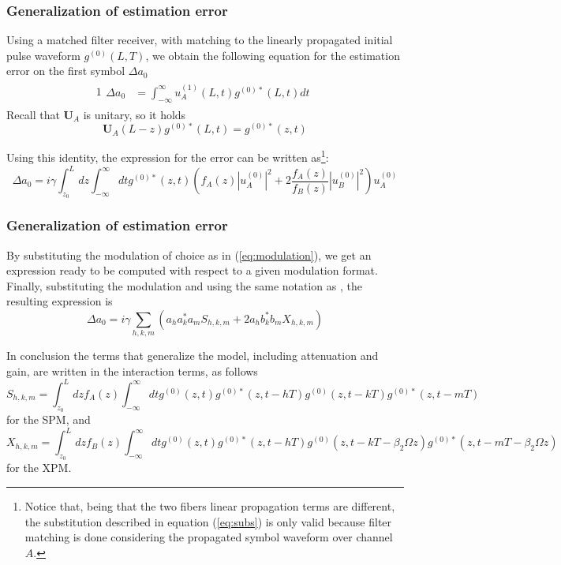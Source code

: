 \documentclass[8pt]{beamer} %
\begin{document}
\begin{frame}
    \frametitle{Generalization of estimation error}
    Using a matched filter receiver, with matching to the linearly propagated initial pulse waveform $g^{(0)}(L, T)$, we obtain the following equation for the estimation error on the first symbol $\Delta a_0$
    \begin{alignat}{1}
        \begin{aligned}
            \Delta a_0 & = \int_{-\infty}^{\infty} u_A^{(1)}(L, t) g^{(0)*}(L, t) dt
        \end{aligned}
    \end{alignat} \label{eq:matched}
    Recall that $\mathbf{U}_A$ is unitary, so it holds
    \begin{equation}\label{eq:subs}
        \mathbf{U}_A(L-z) g^{(0)*}(L, t) = g^{(0)*}(z, t)
    \end{equation}

    Using this identity, the expression for the error can be written as\footnote{Notice that, being that the two fibers linear propagation terms are different, the substitution described in equation (\ref{eq:subs}) is only valid because filter matching is done considering the propagated symbol waveform over channel $A$.}:
    \begin{equation}
        \Delta a_0 = i\gamma \int_{z_0}^{L} dz \int_{-\infty}^{\infty} dt g^{(0)*}(z, t) \left(f_A(z)|u_A^{(0)}|^2 + 2 \dfrac{f_A(z)}{f_B(z)}|u_B^{(0)}|^2\right) u_A^{(0)}
    \end{equation}
\end{frame}

\begin{frame}
    \frametitle{Generalization of estimation error}
    By substituting the modulation of choice as in (\ref{eq:modulation}), we get an expression ready to be computed with respect to a given modulation format.
    Finally, substituting the modulation and using the same notation as \cite[eq. 5, 6, 7]{Dar_2013}, the resulting expression is
    \begin{equation}
        \Delta a_0 = i \gamma \sum_{h, k, m} \left(a_h a_k^* a_m S_{h, k, m} + 2 a_h b_k^* b_m X_{h, k, m}\right)
    \end{equation}

    In conclusion the terms that generalize the model, including attenuation and gain, are written in the interaction terms, as follows
    \begin{equation}
        S_{h, k, m} = \int_{z_0}^{L} dz f_A(z) \int_{-\infty}^{\infty} dt g^{(0)}(z, t) g^{(0)*}(z, t-hT) g^{(0)}(z, t-kT)g^{(0)*}(z, t-mT)
    \end{equation}
    for the SPM, and
    \begin{equation}\label{eq:hkm}
        X_{h, k, m} = \int_{z_0}^{L} dz f_B(z) \int_{-\infty}^{\infty} dt g^{(0)}(z, t) g^{(0)*}(z, t-hT) g^{(0)}(z, t-kT -\beta_2 \Omega z)g^{(0)*}(z, t-mT-\beta_2 \Omega z)
    \end{equation}
    for the XPM.\\
\end{frame}
\end{document}
